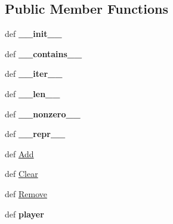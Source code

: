 \subsection*{Public Member Functions}
\begin{DoxyCompactItemize}
\item 
\hypertarget{classcards-with-friends_1_1player_1_1___hand_a5fd754d851506c684339ff0aa39d04ba}{def {\bfseries \-\_\-\-\_\-init\-\_\-\-\_\-}}\label{classcards-with-friends_1_1player_1_1___hand_a5fd754d851506c684339ff0aa39d04ba}

\item 
\hypertarget{classcards-with-friends_1_1player_1_1___hand_a743c6f2318fb0758c5d8efc4f2432859}{def {\bfseries \-\_\-\-\_\-contains\-\_\-\-\_\-}}\label{classcards-with-friends_1_1player_1_1___hand_a743c6f2318fb0758c5d8efc4f2432859}

\item 
\hypertarget{classcards-with-friends_1_1player_1_1___hand_a892734bd2161656d006413916d9cd9d3}{def {\bfseries \-\_\-\-\_\-iter\-\_\-\-\_\-}}\label{classcards-with-friends_1_1player_1_1___hand_a892734bd2161656d006413916d9cd9d3}

\item 
\hypertarget{classcards-with-friends_1_1player_1_1___hand_acbf1685050647cf5701155c37f32d1d9}{def {\bfseries \-\_\-\-\_\-len\-\_\-\-\_\-}}\label{classcards-with-friends_1_1player_1_1___hand_acbf1685050647cf5701155c37f32d1d9}

\item 
\hypertarget{classcards-with-friends_1_1player_1_1___hand_a5a85b2b067c484cb58f55354526efd4b}{def {\bfseries \-\_\-\-\_\-nonzero\-\_\-\-\_\-}}\label{classcards-with-friends_1_1player_1_1___hand_a5a85b2b067c484cb58f55354526efd4b}

\item 
\hypertarget{classcards-with-friends_1_1player_1_1___hand_a5896a3a771c62190388d46644b0a7a41}{def {\bfseries \-\_\-\-\_\-repr\-\_\-\-\_\-}}\label{classcards-with-friends_1_1player_1_1___hand_a5896a3a771c62190388d46644b0a7a41}

\item 
def \hyperlink{classcards-with-friends_1_1player_1_1___hand_a1be4582215f118550b9a0699c5df3129}{Add}
\item 
def \hyperlink{classcards-with-friends_1_1player_1_1___hand_ad39478c86a8ca6fc2df6d0183fbc6a24}{Clear}
\item 
def \hyperlink{classcards-with-friends_1_1player_1_1___hand_a7c2eeab80d852bdf190addb5c3b2d3e5}{Remove}
\item 
\hypertarget{classcards-with-friends_1_1player_1_1___hand_aba6f65ae78d2e64f7d5a304fe59baede}{def {\bfseries player}}\label{classcards-with-friends_1_1player_1_1___hand_aba6f65ae78d2e64f7d5a304fe59baede}

\end{DoxyCompactItemize}



